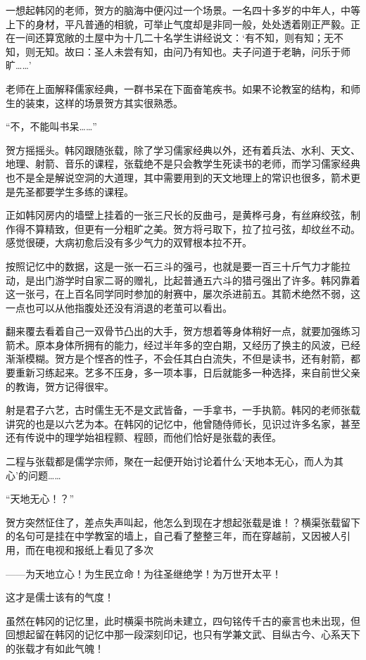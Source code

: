 一想起韩冈的老师，贺方的脑海中便闪过一个场景。一名四十多岁的中年人，中等上下的身材，平凡普通的相貌，可举止气度却是非同一般，处处透着刚正严毅。正在一间还算宽敞的土屋中为十几二十名学生讲经说文：‘有不知，则有知；无不知，则无知。故曰：圣人未尝有知，由问乃有知也。夫子问道于老聃，问乐于师旷……’

老师在上面解释儒家经典，一群书呆在下面奋笔疾书。如果不论教室的结构，和师生的装束，这样的场景贺方其实很熟悉。

“不，不能叫书呆……”

贺方摇摇头。韩冈跟随张载，除了学习儒家经典以外，还有着兵法、水利、天文、地理、射箭、音乐的课程，张载绝不是只会教学生死读书的老师，而学习儒家经典也不是全是解说空洞的大道理，其中需要用到的天文地理上的常识也很多，箭术更是先圣都要学生多练的课程。

正如韩冈房内的墙壁上挂着的一张三尺长的反曲弓，是黄桦弓身，有丝麻绞弦，制作得不算精致，但更有一分粗旷之美。贺方将弓取下，拉了拉弓弦，却纹丝不动。感觉很硬，大病初愈后没有多少气力的双臂根本拉不开。

按照记忆中的数据，这是一张一石三斗的强弓，也就是要一百三十斤气力才能拉动，是出门游学时自家二哥的赠礼，比起普通五六斗的猎弓强出了许多。韩冈靠着这一张弓，在上百名同学同时参加的射赛中，屡次杀进前五。其箭术绝然不弱，这一点也可以从他指腹处还没有消退的老茧可以看出。

翻来覆去看着自己一双骨节凸出的大手，贺方想着等身体稍好一点，就要加强练习箭术。原本身体所拥有的能力，经过半年多的空白期，又经历了换主的风波，已经渐渐模糊。贺方是个悭吝的性子，不会任其白白流失，不但是读书，还有射箭，都要重新习练起来。艺多不压身，多一项本事，日后就能多一种选择，来自前世父亲的教诲，贺方记得很牢。

射是君子六艺，古时儒生无不是文武皆备，一手拿书，一手执箭。韩冈的老师张载讲究的也是以六艺为本。在韩冈的记忆中，他曾随侍师长，见识过许多名家，甚至还有传说中的理学始祖程颢、程颐，而他们恰好是张载的表侄。

二程与张载都是儒学宗师，聚在一起便开始讨论着什么‘天地本无心，而人为其心’的问题……

“天地无心！？”

贺方突然怔住了，差点失声叫起，他怎么到现在才想起张载是谁！？横渠张载留下的名句可是挂在中学教室的墙上，自己看了整整三年，而在穿越前，又因被人引用，而在电视和报纸上看见了多次

——为天地立心！为生民立命！为往圣继绝学！为万世开太平！

这才是儒士该有的气度！

虽然在韩冈的记忆里，此时横渠书院尚未建立，四句铭传千古的豪言也未出现，但回想起留在韩冈的记忆中那一段深刻印记，也只有学兼文武、目纵古今、心系天下的张载才有如此气魄！

